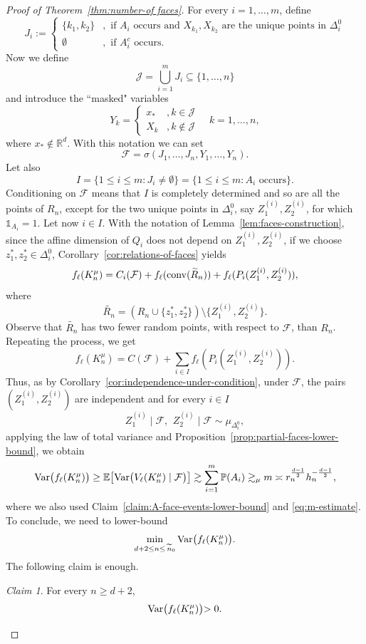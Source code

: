 \documentclass[10pt]{amsart}
\newcommand{\1}{\textbf{1}}
\newcommand{\conv}{{\rm conv}}
\newcommand{\Var}{{\rm Var}}
\numberwithin{equation}{section} %
\theoremstyle{remark}
\newtheorem{claim}{Claim}
\theoremstyle{definition}
\begin{document}
\begin{proof}[Proof of Theorem~\ref{thm:number-of faces}]
For every $i=1,\ldots,m$, define \[J_i:=\begin{cases}
    \{k_1,k_2\} &, \text{ if } A_i \text{ occurs and }  X_{k_1},X_{k_2} \text{ are the unique points in } \Delta_i^0\\
    \emptyset &, \text{ if } A_i^c \text{ occurs}. 
\end{cases}
\] Now we define \[\mathcal{J}=\bigcup_{i=1}^m  J_i\subseteq \{1,\ldots,n\} \] and introduce the ``masked" variables \[
Y_k=\begin{cases}
x_\ast &, k \in \mathcal{J}\\
X_k &, k \notin \mathcal{J}
\end{cases}
\quad k=1,\ldots,n,\] where $x_\ast \notin \mathbb{R}^d$. With this notation we can set \[\mathcal{F}=\sigma(J_1,\ldots,J_n,Y_1,\ldots,Y_n).\] Let also \[I = \{1 \leq i \leq m: J_i \neq \emptyset\}=\{1 \leq i \leq m: A_i \text{ occurs}\}.\] Conditioning on $\mathcal{F}$ means that $I$ is completely determined and so are all the points of $R_n$, except for the two unique points in $\Delta_i^0$, say $Z_1^{(i)},Z_2^{(i)}$, for which $\mathds{1}_{A_i}=1$. Let now $i \in I$. With the notation of Lemma~\ref{lem:faces-construction}, since the affine dimension of $Q_i$ does not depend on $Z_1^{(i)},Z_2^{(i)}$, if we choose $z_1^\ast,z_2^\ast \in \Delta_i^0$, Corollary~\ref{cor:relations-of-faces} yields \[f_\ell({K_n^\mu)}=C_i(\mathcal{F})+f_\ell(\conv(\widetilde{R}_n))+f_{\ell}(P_i(Z_1^{(i)},Z_2^{(i)})),\] where \[\widetilde{R_n}=(R_n \cup \{z_1^\ast,z_2^\ast\})\setminus\{Z_1^{(i)},Z_2^{(i)}\}.\] Observe that $\widetilde{R_n}$ has two fewer random points, with respect to $\mathcal{F}$, than $R_n$. Repeating the process, we get \[f_\ell(K_n^\mu)=C(\mathcal{F})+\sum_{i \in I} f_\ell(P_i(Z_1^{(i)},Z_2^{(i)})).\] Thus, as by Corollary~\ref{cor:independence-under-condition}, under $\mathcal{F}$, the pairs $(Z_1^{(i)},Z_2^{(i)})$ are independent and for every $i \in I$ \[Z_1^{(i)}\mid \mathcal{F}, \,\ Z_2^{(i)}\mid\mathcal{F}\sim\mu_{\Delta_i^0},\] applying the  law of total variance and Proposition~\ref{prop:partial-faces-lower-bound}, we obtain \begin{align*}\Var\bigl(f_\ell(K_n^\mu)\bigr)  
    \geq \mathbb{E}\bigl[\Var\bigl(V_\ell(K_n^\mu)\mid \mathcal{F}\bigr)\bigr]\gtrsim  \sum_{i=1}^{m}\mathbb{P}(A_i) \gtrsim_\mu  m \asymp r_n^{\frac{d-1}{2}}h_n^{-\frac{d-1}{2}},
\end{align*}
    where we also used Claim~\ref{claim:A-face-events-lower-bound} and
\eqref{eq:m-estimate}. 
To conclude, we need to lower-bound \[\min_{d+2 \leq n \leq\,\widetilde{n}_0} \Var\bigl(f_\ell(K_n^\mu)\bigl).\] The following claim is enough.
    \begin{claim}
        For every $n \geq d+2$, \[\Var\bigl(f_\ell(K_n^\mu)\bigl)>0.\]
    \end{claim}


\end{proof}
\end{document}
